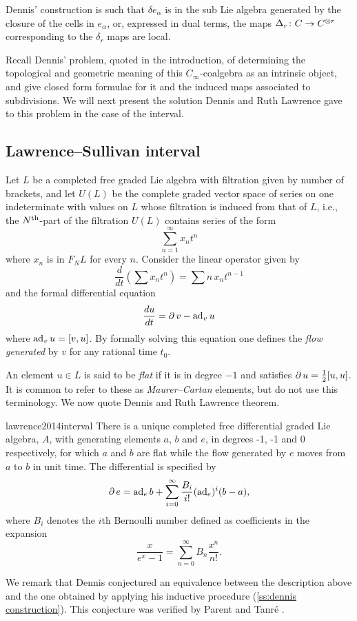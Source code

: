 Dennis' construction is such that $\delta e_\alpha$ is in the sub Lie algebra generated by the closure of the cells in $e_\alpha$, or, expressed in dual terms, the maps $\operatorname{\Delta}_r \colon C \to C^{\otimes r}$ corresponding to the $\delta_r$ maps are local.

Recall Dennis' problem, quoted in the introduction, of determining the topological and geometric meaning of this $C_\infty$-coalgebra as an intrinsic object, and give closed form formulae for it and the induced maps associated to subdivisions.
We will next present the solution Dennis and Ruth Lawrence gave to this problem in the case of the interval.

\subsection{Lawrence--Sullivan interval} \label{ss:LS interval}

Let $L$ be a completed free graded Lie algebra with filtration given by number of brackets, and let $U(L)$ be the complete graded vector space of series on one indeterminate with values on $L$ whose filtration is induced from that of $L$, i.e., the $N^{\mathrm{th}}$-part of the filtration $U(L)$ contains series of the form
\[
\sum_{n=1}^\infty x_n t^n
\]
where $x_n$ is in $F_N L$ for every $n$.
Consider the linear operator given by
\[
\frac{d}{dt} \left(\sum x_n t^n\right) = \sum n \, x_n t^{n-1}
\]
and the formal differential equation
\[
\frac{du}{dt} = \operatorname{\partial} v - \operatorname{ad}_v u
\]
where $\operatorname{ad}_v u = [v, u]$.
By formally solving this equation one defines the \textit{flow generated} by $v$ for any rational time $t_0$.

An element $u \in L$ is said to be \textit{flat} if it is in degree $-1$ and satisfies $\operatorname{\partial} u = \frac{1}{2} [u,u]$.
It is common to refer to these as \textit{Maurer--Cartan} elements, but do not use this terminology.
We now quote Dennis and Ruth Lawrence theorem.
\begin{displaycquote}[Theorem 1]{lawrence2014interval}
	There is a unique completed free differential graded Lie algebra, $A$, with generating elements $a$, $b$ and $e$, in degrees -1, -1 and 0 respectively, for which $a$ and $b$ are flat while the flow generated by $e$ moves from $a$ to $b$ in unit time.
	The differential is specified by
	\[
	\operatorname{\partial} e = \operatorname{ad}_e b + \sum_{i=0}^{\infty} \frac{B_i}{i!}(\operatorname{ad}_e)^i(b-a),
	\]
	where $B_i$ denotes the $i$th Bernoulli number defined as coefficients in the expansion
	\[
	\frac{x}{e^x-1} = \sum_{n=0}^{\infty} B_n \frac{x^n}{n!}.
	\]
\end{displaycquote}
We remark that Dennis conjectured an equivalence between the description above and the one obtained by applying his inductive procedure (\cref{ss:dennis construction}).
This conjecture was verified by Parent and Tanr\'{e} \cite{parent2012interval}.

